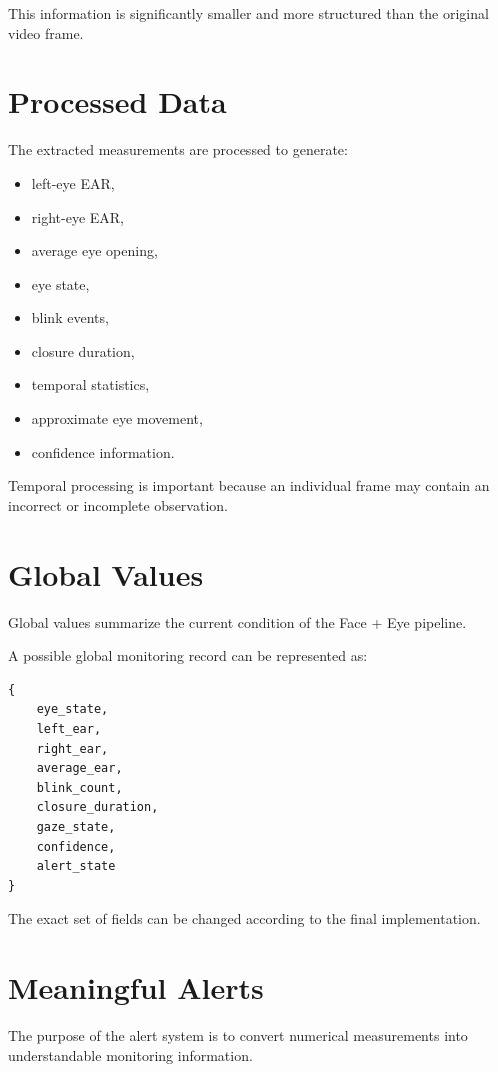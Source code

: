 \documentclass[12pt]{tietreport}
\begin{document}
This information is significantly smaller and more structured than
the original video frame.

\section{Processed Data}

The extracted measurements are processed to generate:

\begin{itemize}[leftmargin=*]
    \item left-eye EAR,
    \item right-eye EAR,
    \item average eye opening,
    \item eye state,
    \item blink events,
    \item closure duration,
    \item temporal statistics,
    \item approximate eye movement,
    \item confidence information.
\end{itemize}

Temporal processing is important because an individual frame may
contain an incorrect or incomplete observation.

\section{Global Values}

Global values summarize the current condition of the Face + Eye
pipeline.

A possible global monitoring record can be represented as:

\begin{verbatim}
{
    eye_state,
    left_ear,
    right_ear,
    average_ear,
    blink_count,
    closure_duration,
    gaze_state,
    confidence,
    alert_state
}
\end{verbatim}

The exact set of fields can be changed according to the final
implementation.

\section{Meaningful Alerts}

The purpose of the alert system is to convert numerical measurements
into understandable monitoring information.
\end{document}
